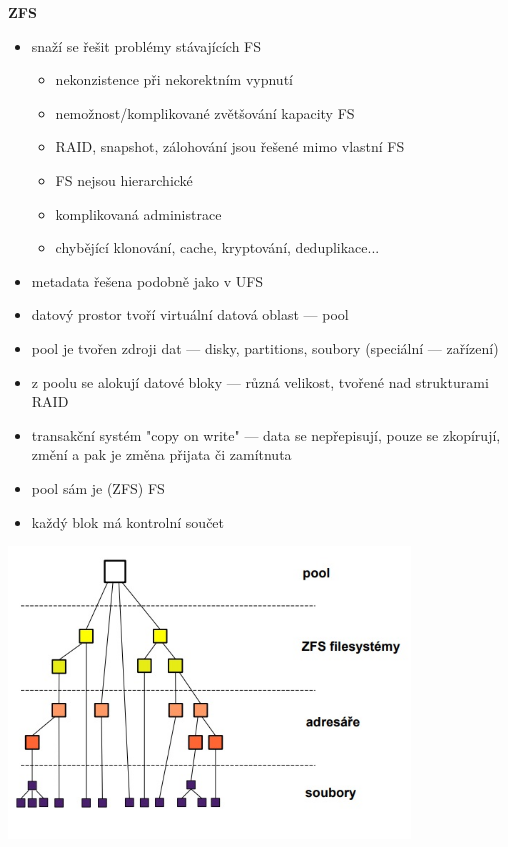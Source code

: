 \textbf{ZFS}
\begin{itemize}
    \item snaží se řešit problémy stávajících FS
    \begin{itemize}
        \item nekonzistence při nekorektním vypnutí
        \item nemožnost/komplikované zvětšování kapacity FS
        \item RAID, snapshot, zálohování jsou řešené mimo vlastní FS
        \item FS nejsou hierarchické
        \item komplikovaná administrace
        \item chybějící klonování, cache, kryptování, deduplikace...
    \end{itemize}
    \item metadata řešena podobně jako v UFS
    \item datový prostor tvoří virtuální datová oblast --- pool
    \item pool je tvořen zdroji dat --- disky, partitions, soubory (speciální --- zařízení)
    \item z poolu se alokují datové bloky --- různá velikost, tvořené nad strukturami RAID
    \item transakční systém "copy on write" --- data se nepřepisují, pouze se zkopírují, změní a pak je změna přijata či zamítnuta
    \item pool sám je (ZFS) FS
    \item každý blok má kontrolní součet
\end{itemize}

\includegraphics[width=0.8\textwidth]{img/OB-2_1.jpg}

